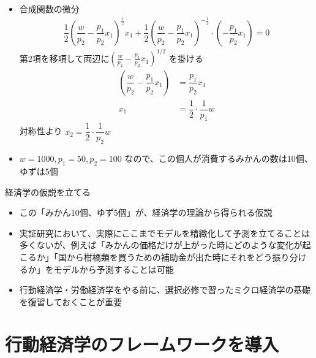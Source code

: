 \documentclass[dvipdfmx,11pt]{beamer}
\begin{document}
\begin{frame}{}
  \begin{itemize}
    \item 合成関数の微分
    \begin{align*}
    \dfrac{1}{2}\left( \dfrac{w}{p_2} - \dfrac{p_1}{p_2} x_1 \right)^{\frac{1}{2}} x_1 + \dfrac{1}{2}\left( \dfrac{w}{p_2} - \dfrac{p_1}{p_2} x_1 \right)^{-\frac{1}{2}} \cdot \left(-\dfrac{p_1}{p_2}x_1 \right) = 0
    \end{align*}
    第2項を移項して両辺に$\left( \frac{w}{p_2} - \frac{p_1}{p_2} x_1 \right)^{1/2}$ を掛ける
    \begin{align*}
      \left( \dfrac{w}{p_2} - \dfrac{p_1}{p_2} x_1 \right) &= \dfrac{p_1}{p_2} x_1 \\
      x_1 &= \dfrac{1}{2} \cdot \dfrac{1}{p_1}w
    \end{align*}
    対称性より $x_2 = \dfrac{1}{2} \cdot \dfrac{1}{p_2}w$
    \item $w = 1000, p_1 = 50, p_2 = 100$ なので、この個人が消費するみかんの数は10個、ゆずは5個
  \end{itemize}
\end{frame}

\begin{frame}{経済学の仮説を立てる}
  \begin{itemize}
    \item この「みかん10個、ゆず5個」が、経済学の理論から得られる仮説
    \item 実証研究において、実際にここまでモデルを精緻化して予測を立てることは多くないが、例えば「みかんの価格だけが上がった時にどのような変化が起こるか」「国から柑橘類を買うための補助金が出た時にそれをどう振り分けるか」をモデルから予測することは可能
    \item 行動経済学・労働経済学をやる前に、選択必修で習ったミクロ経済学の基礎を復習しておくことが重要
  \end{itemize}
\end{frame}

\section{行動経済学のフレームワークを導入}
\frame{\sectionpage}
\end{document}

